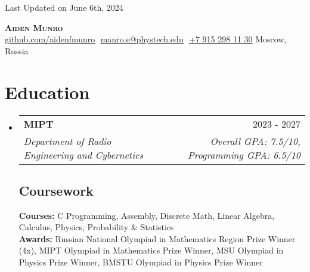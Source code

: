\documentclass[letterpaper,11pt]{article}
\makeatletter
\newcommand{\resumeSubheading}[4]{
  \vspace{-2pt}\item
    \begin{tabular*}{0.97\textwidth}[t]{l@{\extracolsep{\fill}}r}
      \textbf{#1} & #2 \\
      \textit{\small#3} & \textit{\small #4} \\
    \end{tabular*}\vspace{-7pt}
}
\newcommand{\resumeSubHeadingListStart}{\begin{itemize}[leftmargin=0.15in, label={}]}
\newcommand{\resumeSubHeadingListEnd}{\end{itemize}}
\makeatother
\begin{document}
\begin{flushright}
  \color{gray}
  \item
  Last Updated on June 6th, 2024
\end{flushright}

\vspace{-5pt}

\begin{center}
    \textbf{\Huge \scshape Aiden Munro} \\ \vspace{8pt}
    \small 
    \href{https://github.com/aidenfmunro}{\underline{github.com/aidenfmunro}} $  $
    \href{mailto:manro.e@phystech.edu}{\underline{manro.e@phystech.edu}} $ $
    \underline{+7 915 298 11 30} 
    Moscow, Russia
\end{center}

\section{Education}
  \resumeSubHeadingListStart
  
    \resumeSubheading
      {MIPT}{2023 - 2027}
      {Department of Radio Engineering and Cybernetics}{Overall GPA: 7.5/10, Programming GPA: 6.5/10}

    \vspace{-10pt}

    \subsection{Coursework}
      \textbf{Courses:} C Programming, Assembly, Discrete Math, Linear Algebra, Calculus, Physics, Probability \& Statistics \\
      \textbf{Awards:} Russian National Olympiad in Mathematics Region Prize Winner (4x), MIPT Olympiad in Mathematics Prize Winner, MSU Olympiad in Physics Prize Winner, BMSTU Olympiad in Physics Prize Winner

  \resumeSubHeadingListEnd

\end{document}
